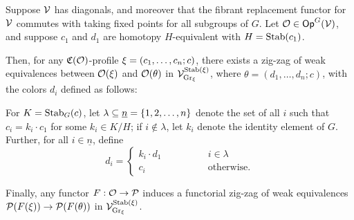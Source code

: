 \documentclass[a4paper,10pt
,draft
]{article}%
\renewcommand{\1}{\ensuremath{\mathbb{id}}}
\begin{document}
\begin{lemma}
      \label{CAV_4.14_PROP2}
      Suppose $\mathcal V$ has diagonals, 
      and moreover that the fibrant replacement functor for $\mathcal V$ commutes with taking fixed points for all subgroups of $G$.
      Let $\mathcal{O} \in \mathsf{Op}^G(\mathcal V)$, and suppose
      $c_1$ and $d_1$ are homotopy $H$-equivalent with $H = \mathrm{Stab}(c_1)$.

      Then, for any $\mathfrak C(\mathcal{O})$-profile $\xi = (c_1,\dots,c_n;c)$,
      there exists a zig-zag of weak equivalences between
      $\mathcal{O}(\xi)$ and $\mathcal{O}(\theta)$
      in $\mathcal V^{\mathrm{Stab}(\xi)}_{\mathrm{Gr}_\xi}$,
      where
      $\theta = (d_1,\ldots, d_n; c)$, with the colors $d_i$ defined as follows:
            
      For $K = \mathrm{Stab}_G(c)$, let $\lambda \subseteq \underline{n} = \left\{1,2,\ldots, n\right\}$ denote
      the set of all $i$ such that $c_i = k_i \cdot c_1$ for some $k_i\in K/H$;
      if $i \notin \lambda$, let $k_i$ denote the identity element of $G$.
      Further, for all $i \in \underline{n}$, define
      \begin{equation}
            \label{DCOLORS_EQ}
            d_i =
            \begin{cases}
                  k_i \cdot d_1 \qquad \qquad & i \in \lambda
                  \\
                  c_i & \mbox{otherwise.}
            \end{cases}
      \end{equation}
      
      Finally, any functor $F: \mathcal{O} \to \mathcal{P}$ induces a functorial zig-zag of weak equivalences
      $\mathcal{P}(F(\xi)) \to \mathcal{P}(F(\theta))$ in $\mathcal V^{\mathrm{Stab}(\xi)}_{\mathrm{Gr}_\xi}$.
\end{lemma}
\end{document}
